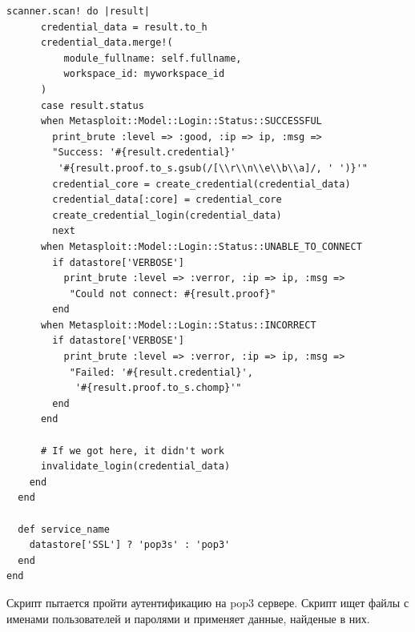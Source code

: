 \documentclass[a4paper, 14pt]{article}				%
\begin{document}
\begin{Verbatim}[frame=single]
    scanner.scan! do |result|
      credential_data = result.to_h
      credential_data.merge!(
          module_fullname: self.fullname,
          workspace_id: myworkspace_id
      )
      case result.status
      when Metasploit::Model::Login::Status::SUCCESSFUL
        print_brute :level => :good, :ip => ip, :msg => 
        "Success: '#{result.credential}'
         '#{result.proof.to_s.gsub(/[\\r\\n\\e\\b\\a]/, ' ')}'"
        credential_core = create_credential(credential_data)
        credential_data[:core] = credential_core
        create_credential_login(credential_data)
        next
      when Metasploit::Model::Login::Status::UNABLE_TO_CONNECT
        if datastore['VERBOSE']
          print_brute :level => :verror, :ip => ip, :msg =>
           "Could not connect: #{result.proof}"
        end
      when Metasploit::Model::Login::Status::INCORRECT
        if datastore['VERBOSE']
          print_brute :level => :verror, :ip => ip, :msg =>
           "Failed: '#{result.credential}',
            '#{result.proof.to_s.chomp}'"
        end
      end

      # If we got here, it didn't work
      invalidate_login(credential_data)
    end
  end

  def service_name
    datastore['SSL'] ? 'pop3s' : 'pop3'
  end
end
\end{Verbatim}
Скрипт пытается пройти аутентификацию на pop3 сервере. Скрипт ищет файлы с именами пользователей и паролями и применяет данные, найденые в них.

\newpage
\end{document}
